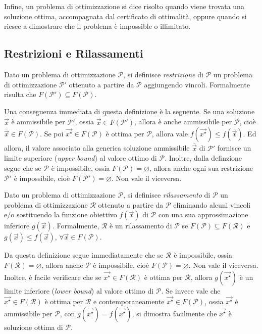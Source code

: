 Infine, un problema di ottimizzazione si dice risolto quando viene trovata una
soluzione ottima, accompagnata dal certificato di ottimalità, oppure
quando si riesce a dimostrare che il problema è impossible o illimitato.

\subsection{Restrizioni e Rilassamenti}
\begin{definition}[Restrizione]
Dato un problema di ottimizzazione $\mathcal{P}$, si definisce
\textit{restrizione} di $\mathcal{P}$ un problema di ottimizzazione
$\mathcal{P}'$ ottenuto a partire da $\mathcal{P}$ aggiungendo vincoli.
Formalmente risulta che $F(\mathcal{P}') \subseteq F(\mathcal{P})$.
\end{definition}
Una conseguenza immediata di questa definizione è la seguente. Se una
soluzione $\bar{\vec{x}}$ è ammissibile per $\mathcal{P}'$, ossia
$\bar{\vec{x}} \in F(\mathcal{P}')$, allora è anche ammissibile per
$\mathcal{P}$, cioè $\bar{\vec{x}} \in F(\mathcal{P})$. Se poi
$\vec{x^{\star}} \in F(\mathcal{P})$ è ottima per $\mathcal{P}$, allora
vale $f(\vec{x^{\star}}) \le f(\bar{\vec{x}})$. Ed allora, il valore
associato alla generica soluzione ammissibile $\bar{\vec{x}}$ di
$\mathcal{P}'$ fornisce un limite superiore (\textit{upper bound}) al
valore ottimo di $\mathcal{P}$. Inoltre, dalla definzione segue
che se $\mathcal{P}$ è impossibile, ossia $F(\mathcal{P}) = \varnothing$,
allora anche ogni sua restrizione $\mathcal{P}'$ è impossibile, cioè
$F(\mathcal{P}') = \varnothing$. Non vale il viceversa.
\begin{definition}[Rilassamento]
Dato un problema di ottimizzazione $\mathcal{P}$, si definisce
\textit{rilassamento} di $\mathcal{P}$ un problema di ottimizzazione
$\mathcal{R}$ ottenuto a partire da $\mathcal{P}$ eliminando alcuni vincoli
e/o sostituendo la funzione obiettivo $f(\vec{x})$ di $\mathcal{P}$ con una
sua approssimazione inferiore $g(\vec{x}).$ Formalmente, $\mathcal{R}$ è un
rilassamento di $\mathcal{P}$ se $F(\mathcal{P}) \subseteq F(\mathcal{R})$
e $g(\vec{x}) \le f(\vec{x}),\, \forall \vec{x} \in F(\mathcal{P})$.
\end{definition}
Da questa definizione segue immediatamente che se $\mathcal{R}$ è
impossibile, ossia $F(\mathcal{R}) = \varnothing$, allora anche
$\mathcal{P}$ è impossibile, cioè $F(\mathcal{P}) = \varnothing$. Non vale
il viceversa. Inoltre, è facile verificare che se $\vec{x^{\star}} \in
F(\mathcal{R})$ è ottima per $\mathcal{R}$, allora $g(\vec{x^{\star}})$ è
un limite inferiore (\textit{lower bound}) al valore ottimo di
$\mathcal{P}$. Se invece vale che $\vec{x^{\star}} \in F(\mathcal{R})$ è
ottima per $\mathcal{R}$ e contemporaneamente $\vec{x^{\star}} \in
F(\mathcal{P})$, ossia $\vec{x^{\star}}$ è ammissibile per $\mathcal{P}$,
con $g(\vec{x^{\star}}) = f(\vec{x^{\star}})$, si dimostra facilmente che
$\vec{x^{\star}}$ è soluzione ottima di $\mathcal{P}$.

